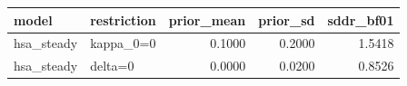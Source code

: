 \begin{tabular}{llrrr}
\toprule
model & restriction & prior\_mean & prior\_sd & sddr\_bf01 \\
\midrule
hsa\_steady & kappa\_0=0 & 0.1000 & 0.2000 & 1.5418 \\
hsa\_steady & delta=0 & 0.0000 & 0.0200 & 0.8526 \\
\bottomrule
\end{tabular}
